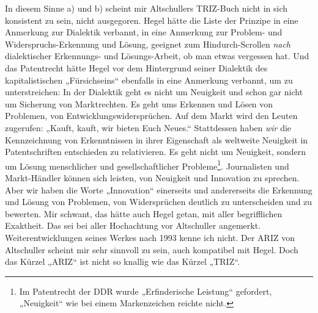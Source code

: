 \documentclass[12pt,a4paper]{article}
\begin{document}
In diesem Sinne a) und b) scheint mir Altschullers TRIZ-Buch nicht in sich
konsistent zu sein, nicht ausgegoren. Hegel hätte die Liste der Prinzipe in
eine Anmerkung zur Dialektik verbannt, in eine Anmerkung zur Problem- und
Widerspruchs-Erkennung und Lösung, geeignet zum Hindurch-Scrollen \emph{nach}
dialektischer Erkennungs- und Lösungs-Arbeit, ob man etwas vergessen hat. Und
das Patentrecht hätte Hegel vor dem Hintergrund seiner Dialektik des
kapitalistischen „Fürsichseins“ ebenfalls in eine Anmerkung verbannt, um zu
unterstreichen: In der Dialektik geht es nicht um Neuigkeit und schon gar nicht
um Sicherung von Marktrechten. Es geht ums Erkennen und Lösen von Problemen,
von Entwicklungswidersprüchen. Auf dem Markt wird den Leuten zugerufen: „Kauft,
kauft, wir bieten Euch Neues.“ Stattdessen haben \emph{wir} die Kennzeichnung
von Erkenntnissen in ihrer Eigenschaft als weltweite Neuigkeit in
Patentschriften entschieden zu relativieren. Es geht nicht um Neuigkeit,
sondern um Lösung menschlicher und gesellschaftlicher Probleme\footnote{Im
  Patentrecht der DDR wurde „Erfinderische Leistung“ gefordert, „Neuigkeit“ wie
  bei einem Markenzeichen reichte nicht.}. Journalisten und Markt-Händler
können sich leisten, von Neuigkeit und Innovation zu sprechen. Aber wir haben
die Worte „Innovation“ einerseits und andererseits die Erkennung und Lösung von
Problemen, von Widersprüchen deutlich zu unterscheiden und zu bewerten. Mir
schwant, das hätte auch Hegel getan, mit aller begrifflichen Exaktheit. Das sei
bei aller Hochachtung vor Altschuller angemerkt. Weiterentwicklungen seines
Werkes nach 1993 kenne ich nicht. Der ARIZ von Altschuller scheint mir sehr
sinnvoll zu sein, auch kompatibel mit Hegel. Doch das Kürzel „ARIZ“ ist nicht
so knallig wie das Kürzel „TRIZ“.
\end{document}
